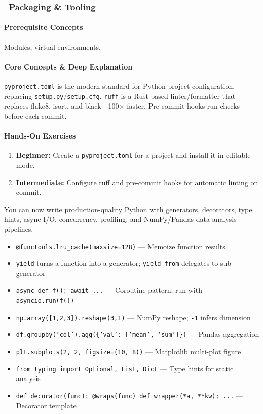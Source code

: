 \documentclass[11pt, a4paper, oneside]{report}
\newcommand{\mustmaster}[1]{\subsubsection{\texorpdfstring{\fcolorbox{blue!40!black}{blue!8}{\footnotesize\bfseries\color{blue!40!black} MUST MASTER}~#1}{#1}}}
\begin{document}
\mustmaster{Packaging \& Tooling}

\paragraph{Prerequisite Concepts} Modules, virtual environments.

\paragraph{Core Concepts \& Deep Explanation} \texttt{pyproject.toml} is the modern standard for Python project configuration, replacing \texttt{setup.py}/\texttt{setup.cfg}. \texttt{ruff} is a Rust-based linter/formatter that replaces flake8, isort, and black---100$\times$ faster. Pre-commit hooks run checks before each commit.

\paragraph{Hands-On Exercises}
\begin{enumerate}[leftmargin=*]
\item \textbf{Beginner:} Create a \texttt{pyproject.toml} for a project and install it in editable mode.
\item \textbf{Intermediate:} Configure ruff and pre-commit hooks for automatic linting on commit.
\end{enumerate}

\begin{microcheckpoint}
You can now write production-quality Python with generators, decorators, type hints, async I/O, concurrency, profiling, and NumPy/Pandas data analysis pipelines.
\end{microcheckpoint}

\begin{cheatsheetbox}
\begin{itemize}[leftmargin=*]
\item \texttt{@functools.lru\_cache(maxsize=128)} --- Memoize function results
\item \texttt{yield} turns a function into a generator; \texttt{yield from} delegates to sub-generator
\item \texttt{async def f(): await ...} --- Coroutine pattern; run with \texttt{asyncio.run(f())}
\item \texttt{np.array([1,2,3]).reshape(3,1)} --- NumPy reshape; \texttt{-1} infers dimension
\item \texttt{df.groupby('col').agg(\{'val': ['mean', 'sum']\})} --- Pandas aggregation
\item \texttt{plt.subplots(2, 2, figsize=(10, 8))} --- Matplotlib multi-plot figure
\item \texttt{from typing import Optional, List, Dict} --- Type hints for static analysis
\item \texttt{def decorator(func): @wraps(func) def wrapper(*a, **kw): ...} --- Decorator template
\end{itemize}
\end{cheatsheetbox}
\end{document}
